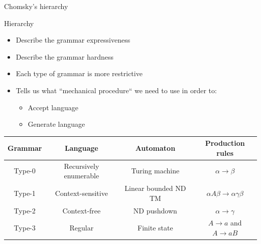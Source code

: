 \documentclass{beamer}
\begin{document}
\begin{frame}{Chomsky's hierarchy}

\begin{block}{Hierarchy}
\begin{itemize}
\item Describe the grammar expressiveness
\item Describe the grammar hardness
\item Each type of grammar is more restrictive
\item Tells us what ``mechanical procedure`` we need to use in order to:
\begin{itemize}
\item Accept language
\item Generate language
\end{itemize}
\end{itemize}
\end{block}
\vskip -0.5cm
\begin{table}\footnotesize
\begin{tabular}{c|c|c|c}
\textbf{Grammar} & \textbf{Language} & \textbf{Automaton} & \textbf{Production rules} \\
\hline
Type-0 & Recursively enumerable & Turing machine &  $\alpha \rightarrow \beta$ \\ %
Type-1 & Context-sensitive & Linear bounded ND TM &$\alpha A\beta \rightarrow \alpha \gamma \beta$ \\ 
Type-2 & Context-free & ND pushdown & $\alpha \rightarrow \gamma$ \\ 
Type-3 & Regular & Finite state &$A\rightarrow a$ and $A\rightarrow aB$ 
\end{tabular}
\end{table}


\end{frame}
\end{document}
